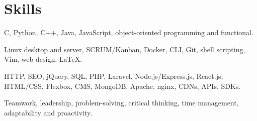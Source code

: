 \section{Skills}
{C, Python, C++, Java, JavaScript, object-oriented programming and functional.}

{Linux desktop and server, SCRUM/Kanban, Docker, CLI, Git, shell scripting, Vim, web design, {\LaTeX}.}

{HTTP, SEO, jQuery, SQL, PHP, Laravel, Node.js/Express.js, React.js, HTML/CSS, Flexbox, CMS, MongoDB, Apache, nginx, CDNs, APIs, SDKs.}

{Teamwork, leadership, problem-solving, critical thinking, time management, adaptability and proactivity.}
